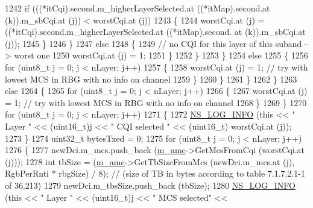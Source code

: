 \begin{DoxyCode}
1242                           \textcolor{keywordflow}{if} (((*itCqi).second.m\_higherLayerSelected.at ((*itMap).second.at (k)).m\_sbCqi.at
       (j)) < worstCqi.at (j))
1243                             \{
1244                               worstCqi.at (j) = ((*itCqi).second.m\_higherLayerSelected.at ((*itMap).second.
      at (k)).m\_sbCqi.at (j));
1245                             \}
1246                         \}
1247                       \textcolor{keywordflow}{else}
1248                         \{
1249                           \textcolor{comment}{// no CQI for this layer of this suband -> worst one}
1250                           worstCqi.at (j) = 1;
1251                         \}
1252                     \}
1253                 \}
1254               \textcolor{keywordflow}{else}
1255                 \{
1256                   \textcolor{keywordflow}{for} (uint8\_t j = 0; j < nLayer; j++)
1257                     \{
1258                       worstCqi.at (j) = 1; \textcolor{comment}{// try with lowest MCS in RBG with no info on channel}
1259                     \}
1260                 \}
1261             \}
1262         \}
1263       \textcolor{keywordflow}{else}
1264         \{
1265           \textcolor{keywordflow}{for} (uint8\_t j = 0; j < nLayer; j++)
1266             \{
1267               worstCqi.at (j) = 1; \textcolor{comment}{// try with lowest MCS in RBG with no info on channel}
1268             \}
1269         \}
1270       \textcolor{keywordflow}{for} (uint8\_t j = 0; j < nLayer; j++)
1271         \{
1272           \hyperlink{group__logging_gafbd73ee2cf9f26b319f49086d8e860fb}{NS\_LOG\_INFO} (\textcolor{keyword}{this} << \textcolor{stringliteral}{" Layer "} << (uint16\_t)j << \textcolor{stringliteral}{" CQI selected "} << (uint16\_t)
      worstCqi.at (j));
1273         \}
1274       uint32\_t bytesTxed = 0;
1275       \textcolor{keywordflow}{for} (uint8\_t j = 0; j < nLayer; j++)
1276         \{
1277           newDci.m\_mcs.push\_back (\hyperlink{classns3_1_1PfFfMacScheduler_a8ed3fd6ae921b6161a10c2c9b0e869a4}{m\_amc}->GetMcsFromCqi (worstCqi.at (j)));
1278           \textcolor{keywordtype}{int} tbSize = (\hyperlink{classns3_1_1PfFfMacScheduler_a8ed3fd6ae921b6161a10c2c9b0e869a4}{m\_amc}->GetTbSizeFromMcs (newDci.m\_mcs.at (j), RgbPerRnti * rbgSize) / 8); \textcolor{comment}{//
       (size of TB in bytes according to table 7.1.7.2.1-1 of 36.213)}
1279           newDci.m\_tbsSize.push\_back (tbSize);
1280           \hyperlink{group__logging_gafbd73ee2cf9f26b319f49086d8e860fb}{NS\_LOG\_INFO} (\textcolor{keyword}{this} << \textcolor{stringliteral}{" Layer "} << (uint16\_t)j << \textcolor{stringliteral}{" MCS selected"} << 

\end{DoxyCode}
